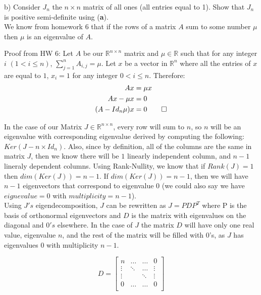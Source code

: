 \documentclass[12pt,twoside]{article}
\newcommand{\R}{\mathbb{R}}
\begin{document}
\newpage

b) Consider $J_n$ the $n \times n$ matrix of all ones (all entries equal to 1). Show that $J_n$ is positive semi-definite using \normalfont(\textbf{a}).\\

We know from homework 6 that if the rows of a matrix $A$ sum to some number $\mu$ then $\mu$ is an eigenvalue of $A$. 

Proof from HW 6:
Let $A$ be our $\R^{n\times n}$ matrix and $\mu \in \R$ such that for any integer $i$ $(1 < i \leq n)$, $\sum_{j=1}^n A_{i,j} = \mu$. Let $x$ be a vector in $\R^n$ where all the entries of $x$ are equal to $1$, $x_i = 1$ for any integer $ 0< i \leq n$. Therefore:
\begin{equation}
    \begin{split}
        Ax &= \mu x\\ 
        Ax-\mu x &= 0\\
        (A-Id_n\mu)x &= 0 \qed
\end{split}
\end{equation}

In the case of our Matrix $J \in \R^{n\times n}$, every row will sum to $n$, so $n$ will be an eigenvalue with corresponding eigenvalue derived by computing the following: $Ker(J-n\times Id_n)$. Also, since by definition, all of the columns are the same in matrix $J$, then we know there will be $1$ linearly independent column, and $n-1$ lineraly dependent columns. Using Rank-Nullity, we know that if $Rank(J)=1$ then $dim(Ker(J)) = n-1$. If $dim(Ker(J)) = n-1$, then we will have $n-1$ eigenvectors that correspond to eigenvalue 0 (we could also say we have $eignevalue=0$ with $multiplicity=n-1$).\\

Using $J's$ eigendecomposition, $J$ can be rewritten as $J = PDP^T$ where P is the basis of orthonormal eigenvectors and $D$ is the matrix with eigenvalues on the diagonal and $0's$ elsewhere. In the case of $J$ the matrix $D$ will have only one real value, eigenvalue $n$, and the rest of the matrix will be filled with 0's, as $J$ has eigenvalues $0$ with multiplicity $n-1$.

$$
 D =  \begin{bmatrix} 
 n & \dots & \dots & 0\\
  \vdots & \ddots  & \dots & \vdots\\
   \vdots &   & \ddots & \vdots\\
    0 & \dots  & \dots & 0\\
 \end{bmatrix}
$$
\end{document}
